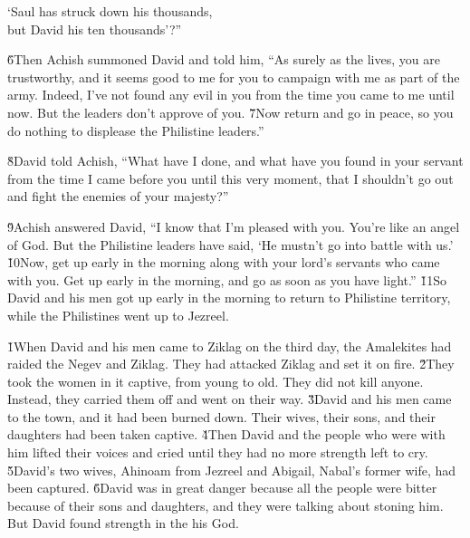 \begin{poetry}
\poeml `Saul has struck down his thousands, \\
\poemll    but David his ten thousands'?''
\end{poetry}

\v{6}Then Achish summoned David and told him, ``As surely as the  lives, you are trustworthy, and it seems good to me for you to campaign with me as part of the army. Indeed, I've not found any evil in you from the time you came to me until now. But the leaders don't approve of you. \v{7}Now return and go in peace, so you do nothing to displease the Philistine leaders.''

\v{8}David told Achish, ``What have I done, and what have you found in your servant from the time I came before you until this very moment, that I shouldn't go out and fight the enemies of your majesty?''

\v{9}Achish answered David, ``I know that I'm pleased with you. You're like an angel of God. But the Philistine leaders have said, `He mustn't go into battle with us.' \v{10}Now, get up early in the morning along with your lord's servants who came with you. Get up early in the morning, and go as soon as you have light.'' \v{11}So David and his men got up early in the morning to return to Philistine territory, while the Philistines went up to Jezreel.

\v{1}When David and his men came to Ziklag on the third day, the Amalekites had raided the Negev and Ziklag. They had attacked Ziklag and set it on fire. \v{2}They took the women in it captive, from young to old. They did not kill anyone. Instead, they carried them off and went on their way. \v{3}David and his men came to the town, and it had been burned down. Their wives, their sons, and their daughters had been taken captive. \v{4}Then David and the people who were with him lifted their voices and cried until they had no more strength left to cry. \v{5}David's two wives, Ahinoam from Jezreel and Abigail, Nabal's former wife, had been captured. \v{6}David was in great danger because all the people were bitter because of their sons and daughters, and they were talking about stoning him. But David found strength in the  his God.

